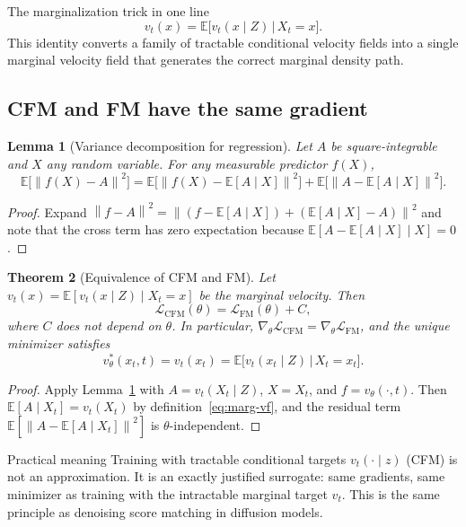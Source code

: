\documentclass[11pt]{article}
\newcommand{\E}{\mathbb{E}}
\newcommand{\norm}[1]{\left\lVert #1 \right\rVert}
\newtheorem{theorem}{Theorem}[section]
\newtheorem{lemma}[theorem]{Lemma}
\theoremstyle{definition}
\theoremstyle{remark}
\begin{document}
\begin{keybox}{The marginalization trick in one line}
\[
v_t(x) = \E\!\big[v_t(x\mid Z)\,\big|\,X_t = x\big].
\]
This identity converts a family of tractable conditional velocity fields into a single marginal velocity field that generates the correct marginal density path.
\end{keybox}

\subsection{CFM and FM have the same gradient}\label{subsec:cfm-fm-equiv}

\begin{lemma}[Variance decomposition for regression]\label{lem:var-decomp}
Let $A$ be square-integrable and $X$ any random variable.
For any measurable predictor $f(X)$,
\[
\E\!\big[\norm{f(X)-A}^2\big] = \E\!\big[\norm{f(X)-\E[A\mid X]}^2\big] + \E\!\big[\norm{A-\E[A\mid X]}^2\big].
\]
\end{lemma}

\begin{proof}
Expand $\norm{f-A}^2 = \norm{(f-\E[A\mid X]) + (\E[A\mid X]-A)}^2$ and note that the cross term has zero expectation because $\E[A - \E[A\mid X]\mid X] = 0$.
\end{proof}

\begin{theorem}[Equivalence of CFM and FM]\label{thm:cfm-fm}
Let $v_t(x) = \E[v_t(x\mid Z)\mid X_t = x]$ be the marginal velocity.
Then
\[
\mathcal{L}_{\mathrm{CFM}}(\theta) = \mathcal{L}_{\mathrm{FM}}(\theta) + C,
\]
where $C$ does not depend on $\theta$.
In particular, $\nabla_\theta\mathcal{L}_{\mathrm{CFM}} = \nabla_\theta\mathcal{L}_{\mathrm{FM}}$, and the unique minimizer satisfies
\[
v^*_\theta(x_t,t) = v_t(x_t) = \E\!\big[v_t(x_t\mid Z)\,\big|\,X_t = x_t\big].
\]
\end{theorem}

\begin{proof}
Apply Lemma~\ref{lem:var-decomp} with $A = v_t(X_t\mid Z)$, $X = X_t$, and $f = v_\theta(\cdot,t)$.
Then $\E[A\mid X_t] = v_t(X_t)$ by definition~\eqref{eq:marg-vf}, and the residual term $\E[\norm{A - \E[A\mid X_t]}^2]$ is $\theta$-independent.
\end{proof}

\begin{resultbox}{Practical meaning}
Training with tractable conditional targets $v_t(\cdot\mid z)$ (CFM) is not an approximation.
It is an exactly justified surrogate: same gradients, same minimizer as training with the intractable marginal target $v_t$.
This is the same principle as denoising score matching in diffusion models.
\end{resultbox}
\end{document}
